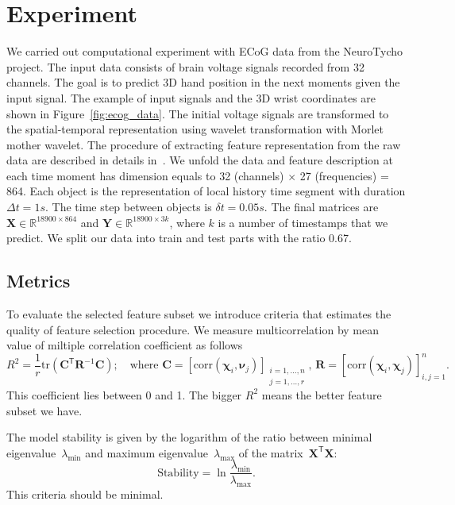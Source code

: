 \documentclass[12pt,oneside]{article}
\theoremstyle{definition}
\newcommand{\bY}{\mathbf{Y}}
\newcommand{\bX}{\mathbf{X}}
\newcommand{\bC}{\mathbf{C}}
\newcommand{\bbR}{\mathbb{R}}
\newcommand{\T}{\mathsf{T}}
\newcommand{\bchi}{\boldsymbol{\chi}}
\newcommand{\bnu}{\boldsymbol{\nu}}
\begin{document}
\newpage
\section{Experiment}

We carried out computational experiment with ECoG data from the NeuroTycho project. The input data consists of brain voltage signals recorded from 32 channels.
The goal is to predict 3D hand position in the next moments given the input signal.
The example of input signals and the 3D wrist coordinates are shown in Figure~\ref{fig:ecog_data}.
The initial voltage signals are transformed to the spatial-temporal representation using wavelet transformation with Morlet mother wavelet.
The procedure of extracting feature representation from the raw data are described in details in~\cite{chao2010long,eliseyev2016penalized}.
We unfold the data and feature description at each time moment has dimension equals to 32 (channels) $\times$ 27 (frequencies) = 864.
Each object is the representation of local history time segment with duration $\Delta t = 1s$. The time step between objects is $\delta t =  0.05s$.
The final matrices are $\bX \in \bbR^{18900 \times 864}$ and $\bY \in \bbR^{18900 \times 3k}$, where $k$ is a number of timestamps that we predict.
We split our data into train and test parts with the ratio 0.67.

\subsection{Metrics}

To evaluate the selected feature subset we introduce criteria that estimates the quality of feature selection procedure.
We measure multicorrelation by mean value of miltiple correlation coefficient as follows
\begin{equation}
R^2 = \frac{1}{r} \text{tr} \left( \bC^{\T} \mathbf{R}^{-1} \bC \right); \quad \text{where }\bC = [ \text{corr}(\bchi_i, \bnu_j)]_{\substack{i=1, \dots, n \\ j=1, \dots, r}}, \, \mathbf{R} = [ \text{corr}(\bchi_i, \bchi_j)]_{i, j = 1}^n.
\end{equation}
This coefficient lies between 0 and 1. The bigger $R^2$ means the better feature subset we have.

The model stability is given by the logarithm of the ratio between minimal eigenvalue~$\lambda_{\min}$ and maximum eigenvalue~$\lambda_{\max}$ of the matrix~$\bX^{\T} \bX$:
\begin{equation}
\text{Stability} = \ln \frac{\lambda_{\min}}{\lambda_{\max}}.
\end{equation}
This criteria should be minimal.
\end{document}

